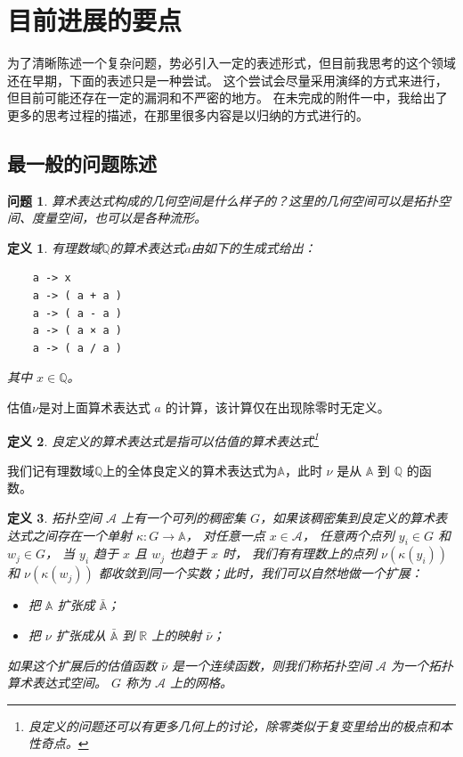 \documentclass[a4paper,12pt]{article}
\newtheorem{problem}{问题}
\numberwithin{problem}{section}
\newtheorem{definition}{定义}
\numberwithin{definition}{section}
\numberwithin{lemma}{section}
\numberwithin{proposition}{section}
\numberwithin{theorem}{section}
\numberwithin{grammar}{section}
\numberwithin{program}{section}
\numberwithin{convention}{section}
\numberwithin{corollary}{section}
\begin{document}
\section{目前进展的要点}

为了清晰陈述一个复杂问题，势必引入一定的表述形式，但目前我思考的这个领域还在早期，下面的表述只是一种尝试。
这个尝试会尽量采用演绎的方式来进行，但目前可能还存在一定的漏洞和不严密的地方。
在未完成的附件一中，我给出了更多的思考过程的描述，在那里很多内容是以归纳的方式进行的。

\subsection{最一般的问题陈述}

\begin{problem}
    算术表达式构成的几何空间是什么样子的？这里的几何空间可以是拓扑空间、度量空间，也可以是各种流形。
\end{problem}

\begin{definition}
    有理数域$\mathbb{Q}$的算术表达式$a$由如下的生成式给出：
    \begin{lstlisting}
    a -> x
    a -> ( a + a )
    a -> ( a - a )
    a -> ( a × a )
    a -> ( a / a )
    \end{lstlisting}
    其中 $x \in \mathbb{Q}$。
\end{definition}

估值$\nu$是对上面算术表达式 $a$ 的计算，该计算仅在出现除零时无定义。

\begin{definition}
    良定义的算术表达式是指可以估值的算术表达式\footnote{良定义的问题还可以有更多几何上的讨论，除零类似于复变里给出的极点和本性奇点。}
\end{definition}

我们记有理数域$\mathbb{Q}$上的全体良定义的算术表达式为$\mathbb{A}$，此时 $\nu$ 是从 $\mathbb{A}$ 到 $\mathbb{Q}$ 的函数。

\begin{definition}
    拓扑空间 $\mathcal{A}$ 上有一个可列的稠密集 $G$，如果该稠密集到良定义的算术表达式之间存在一个单射 $\kappa: G \to \mathbb{A}$，
    对任意一点 $x \in \mathcal{A}$， 任意两个点列 $y_i \in G$ 和 $w_j \in G$， 当 $y_i$ 趋于 $x$ 且 $w_j$ 也趋于 $x$ 时，
    我们有有理数上的点列 $\nu(\kappa(y_i))$ 和 $\nu(\kappa(w_j))$ 都收敛到同一个实数；此时，我们可以自然地做一个扩展：
    \begin{itemize}
        \item 把 $\mathbb{A}$ 扩张成 $\bar{\mathbb{A}}$；
        \item 把 $\nu$ 扩张成从 $\bar{\mathbb{A}}$ 到 $\mathbb{R}$ 上的映射 $\bar{\nu}$；
    \end{itemize}
    如果这个扩展后的估值函数 $\bar{\nu}$ 是一个连续函数，则我们称拓扑空间 $\mathcal{A}$ 为一个拓扑算术表达式空间。 $G$ 称为
    $\mathcal{A}$ 上的网格。
\end{definition}
\end{document}
